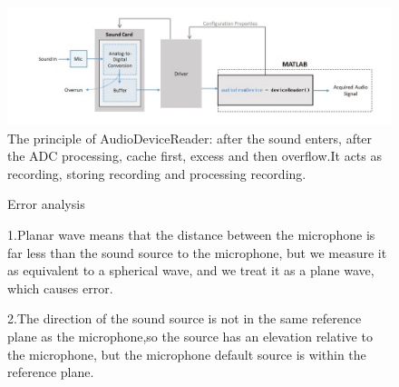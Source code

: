 \documentclass{report}
\begin{document}
\begin{figure}
\includegraphics[scale=0.5]{audiodevicereader}
\\The principle of AudioDeviceReader: after the sound enters, after the ADC processing, cache first, excess and then overflow.It acts as recording, storing recording and processing recording.
\end{figure}

\begin{figure}
Error analysis

1.Planar wave means that the distance between the microphone is far less than the sound source to the microphone, but we measure it as equivalent to a spherical wave, and we treat it as a plane wave, which causes error.

2.The direction of the sound source is not in the same reference plane as the microphone,so the source has an elevation relative to the microphone, but the microphone default source is within the reference plane.
\end{figure}
\end{document}
